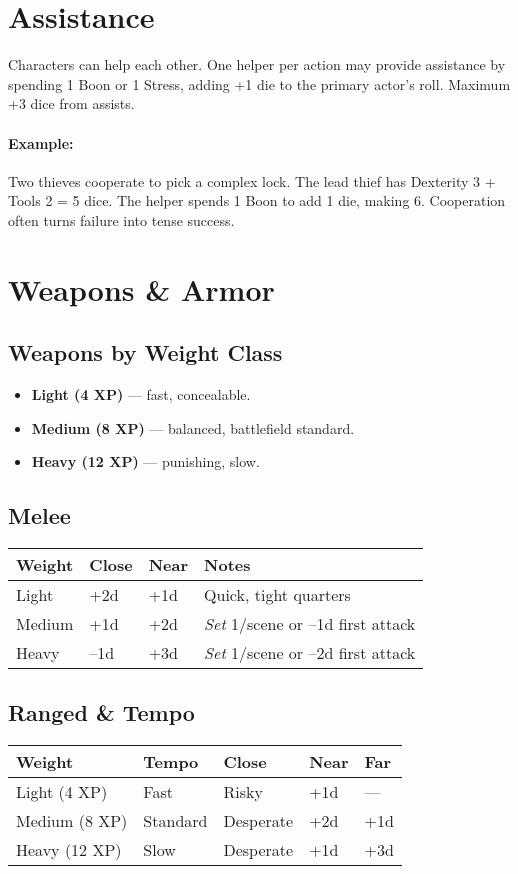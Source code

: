 \section{Assistance} 

Characters can help each other. One helper per action may provide assistance by spending 1 Boon or 1 Stress, adding +1 die to the primary actor's roll. Maximum +3 dice from assists.

\paragraph{Example:}  
Two thieves cooperate to pick a complex lock. The lead thief has Dexterity 3 + Tools 2 = 5 dice. The helper spends 1 Boon to add 1 die, making 6. Cooperation often turns failure into tense success.

\section{Weapons \& Armor}
\label{app:weapons-armor}

\subsection{Weapons by Weight Class}
\begin{itemize}
  \item \textbf{Light (4 XP)} — fast, concealable.
  \item \textbf{Medium (8 XP)} — balanced, battlefield standard.
  \item \textbf{Heavy (12 XP)} — punishing, slow.
\end{itemize}

\subsection*{Melee}
\begin{tabular}{llll}
\toprule
\textbf{Weight} & \textbf{Close} & \textbf{Near} & \textbf{Notes} \\
\midrule
Light & +2d & +1d & Quick, tight quarters \\
Medium & +1d & +2d & \emph{Set} 1/scene or –1d first attack \\
Heavy & –1d & +3d & \emph{Set} 1/scene or –2d first attack \\
\bottomrule
\end{tabular}

\subsection*{Ranged \& Tempo}
\begin{tabular}{lllll}
\toprule
\textbf{Weight} & \textbf{Tempo} & \textbf{Close} & \textbf{Near} & \textbf{Far} \\
\midrule
Light (4 XP) & Fast & Risky & +1d & — \\
Medium (8 XP) & Standard & Desperate & +2d & +1d \\
Heavy (12 XP) & Slow & Desperate & +1d & +3d \\
\bottomrule
\end{tabular}


